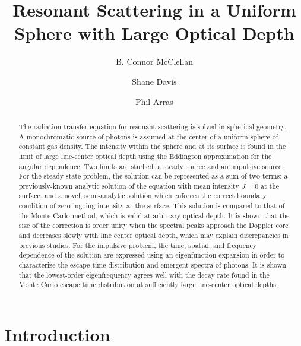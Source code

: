 \documentclass[linenumbers]{aastex63}
\begin{document}
\title{Resonant Scattering in a Uniform Sphere with Large Optical Depth}




\author[0000-0002-6040-8281]{B. Connor McClellan}
\author[0000-0001-7488-4468]{Shane Davis}
\author[0000-0001-5611-1349]{Phil Arras}


\begin{abstract}

The radiation transfer equation for resonant scattering is solved in spherical geometry. A monochromatic source of photons is assumed at the center of a uniform sphere of constant gas density. The intensity within the sphere and at its surface is found in the limit of large line-center optical depth using the Eddington approximation for the angular dependence. Two limits are studied: a steady source and an impulsive source. For the steady-state problem, the solution can be represented as a sum of two terms: a previously-known analytic solution of the equation with  mean intensity $J=0$ at the surface, and a novel, semi-analytic solution which enforces the correct boundary condition of zero-ingoing intensity at the surface. This solution is compared to that of the Monte-Carlo method, which is valid at arbitrary optical depth. It is shown that the size of the correction is order unity when the spectral peaks approach the Doppler core and decreases slowly with line center optical depth, which may explain discrepancies in previous studies. For the impulsive problem, the time, spatial, and frequency dependence of the solution are expressed using an eigenfunction expansion in order to characterize the escape time distribution and emergent spectra of photons. It is shown that the lowest-order eigenfrequency agrees well with the decay rate found in the Monte Carlo escape time distribution at sufficiently large line-center optical depths.

\end{abstract}


\keywords{}

\section{Introduction}
\label{sec:intro}
\end{document}
